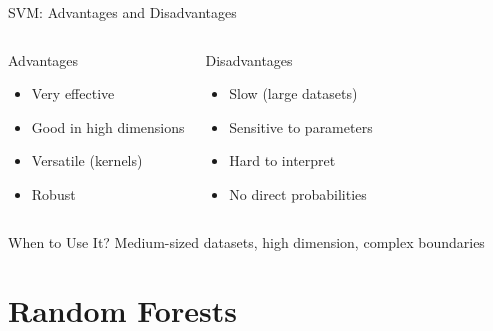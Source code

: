 \documentclass[aspectratio=169]{beamer}
\begin{document}
\begin{frame}{SVM: Advantages and Disadvantages}
\begin{columns}[T]
\begin{block}{Advantages}
\begin{itemize}
    \item Very effective
    \item Good in high dimensions
    \item Versatile (kernels)
    \item Robust
\end{itemize}
\end{block}

\begin{block}{Disadvantages}
\begin{itemize}
    \item Slow (large datasets)
    \item Sensitive to parameters
    \item Hard to interpret
    \item No direct probabilities
\end{itemize}
\end{block}
\end{columns}

\vspace{0.5cm}
\begin{alertblock}{When to Use It?}
Medium-sized datasets, high dimension, complex boundaries
\end{alertblock}
\end{frame}

\section{Random Forests}
\end{document}
